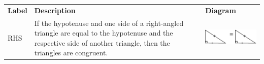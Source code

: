         \begin{center}
      \label{m39368*id317997}
    \noindent
      \tablelasttail{}
      \begin{xtabular*}{\mytablewidth}[t]{|p{10\mystarwidth}|p{10\mystarwidth}|p{10\mystarwidth}|}\hline
                    \textbf{Label}
                   &
                    \textbf{Description}
                   &
                    \textbf{Diagram}
     \tabularnewline{}
        RHS &
        If the hypotenuse and one side of a right-angled triangle are equal to the hypotenuse and the respective side of another triangle, then the triangles are congruent. &
    \setcounter{subfigure}{0}
\label{m39368*id318071}
    \begin{center}
    \label{m39368*id318071!!!underscore!!!media}\label{m39368*id318071!!!underscore!!!printimage}\includegraphics[width=.25\columnwidth]{col11306.imgs/m39368_MG10C13_031.png} %
      \vspace{2pt}
    \vspace{.1in}

\end{center}
\end{xtabular*}
\end{center}
